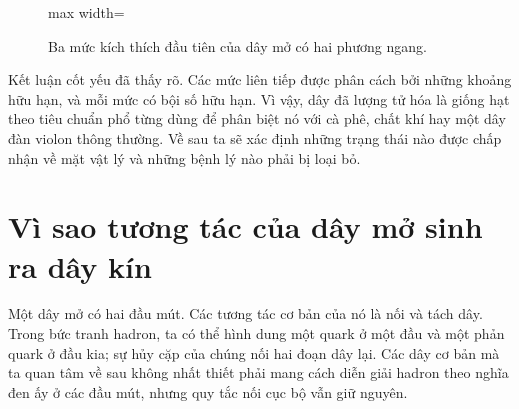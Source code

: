 \begin{figure}[H]
  \centering
  \begin{adjustbox}{max width=\linewidth}
  \end{adjustbox}
  \caption{Ba mức kích thích đầu tiên của dây mở có hai phương ngang.}
  \label{fig:l02-levels-redraw}
\end{figure}

\begin{classroomqa}
\end{classroomqa}

Kết luận cốt yếu đã thấy rõ. Các mức liên tiếp được phân cách bởi những khoảng hữu hạn, và mỗi mức có bội số hữu hạn. Vì vậy, dây đã lượng tử hóa là giống hạt theo tiêu chuẩn phổ từng dùng để phân biệt nó với cà phê, chất khí hay một dây đàn violon thông thường. Về sau ta sẽ xác định những trạng thái nào được chấp nhận về mặt vật lý và những bệnh lý nào phải bị loại bỏ.

\section{Vì sao tương tác của dây mở sinh ra dây kín}

Một dây mở có hai đầu mút. Các tương tác cơ bản của nó là nối và tách dây. Trong bức tranh hadron, ta có thể hình dung một quark ở một đầu và một phản quark ở đầu kia; sự hủy cặp của chúng nối hai đoạn dây lại. Các dây cơ bản mà ta quan tâm về sau không nhất thiết phải mang cách diễn giải hadron theo nghĩa đen ấy ở các đầu mút, nhưng quy tắc nối cục bộ vẫn giữ nguyên.

